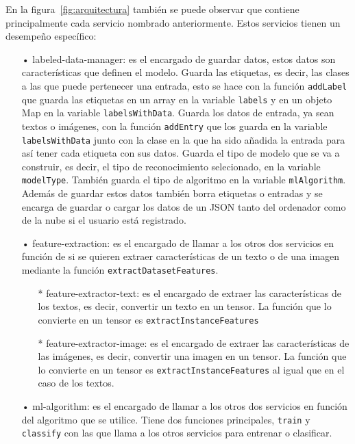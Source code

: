 \documentclass[a4paper, 12pt]{book}
\begin{document}
En la figura~\ref{fig:arquitectura} también se puede observar que contiene principalmente cada servicio nombrado anteriormente. Estos servicios tienen un desempeño específico:

\begin{itemize}
	\item[•] labeled-data-manager: es el encargado de guardar datos, estos datos son características que definen el modelo. Guarda las etiquetas, es decir, las clases a las que puede pertenecer una entrada, esto se hace con la función \texttt{addLabel} que guarda las etiquetas en un array en la variable \texttt{labels} y en un objeto Map en la variable \texttt{labelsWithData}. 
	Guarda los datos de entrada, ya sean textos o imágenes, con la función \texttt{addEntry} que los guarda en la variable \texttt{labelsWithData} junto con la clase en la que ha sido añadida la entrada para así tener cada etiqueta con sus datos. Guarda el tipo de modelo que se va a construir, es decir, el tipo de reconocimiento selecionado, en la variable \texttt{modelType}. También guarda el tipo de algoritmo en la variable \texttt{mlAlgorithm}. 
	Además de guardar estos datos también borra etiquetas o entradas y se encarga de guardar o cargar los datos de un JSON tanto del ordenador como de la nube si el usuario está registrado.
	
	\item[•] feature-extraction: es el encargado de llamar a los otros dos servicios en función de si se quieren extraer características de un texto o de una imagen mediante la función \texttt{extractDatasetFeatures}.
	
	\begin{itemize}
		\item[*] feature-extractor-text: es el encargado de extraer las características de los textos, es decir, convertir un texto en un tensor. 
		La función que lo convierte en un tensor es \texttt{extractInstanceFeatures}
		
		\item[*] feature-extractor-image: es el encargado de extraer las características de las imágenes, es decir, convertir una imagen en un tensor. 
		La función que lo convierte en un tensor es \texttt{extractInstanceFeatures} al igual que en el caso de los textos.
	\end{itemize}
	
	\item[•] ml-algorithm: es el encargado de llamar a los otros dos servicios en función del algoritmo que se utilice. 
	Tiene dos funciones principales, \texttt{train} y \texttt{classify} con las que llama a los otros servicios para entrenar o clasificar.
	

\end{itemize}
\end{document}
